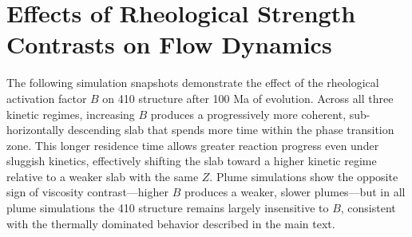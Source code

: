 \documentclass[draft,linenumbers]{agujournal2019}
\begin{document}
\clearpage

\section{Effects of Rheological Strength Contrasts on Flow
Dynamics}\label{sec:rheological-strength-contrasts}

The following simulation snapshots demonstrate the effect of the
rheological activation factor \(B\) on 410 structure after 100 Ma of
evolution. Across all three kinetic regimes, increasing \(B\) produces a
progressively more coherent, sub-horizontally descending slab that
spends more time within the phase transition zone. This longer residence
time allows greater reaction progress even under sluggish kinetics,
effectively shifting the slab toward a higher kinetic regime relative to
a weaker slab with the same \(Z\). Plume simulations show the opposite
sign of viscosity contrast---higher \(B\) produces a weaker, slower
plumes---but in all plume simulations the 410 structure remains largely
insensitive to \(B\), consistent with the thermally dominated behavior
described in the main text.

\clearpage
\end{document}
